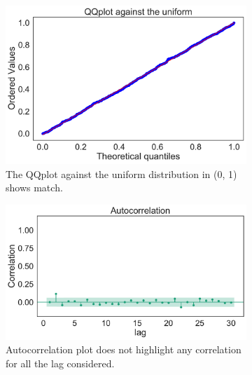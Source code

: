 \documentclass[twoside,onecolumn]{article}
\theoremstyle{definition}
\begin{document}
\begin{figure} \centering
\begin{subfigure}{0.45\textwidth}
         \includegraphics[width=\textwidth]{../results/QQplot.pdf}
         \caption{The QQplot against the uniform distribution in (0, 1) shows match. }\label{fig:lcgqq}
     \end{subfigure} \quad
     \begin{subfigure}{0.5\textwidth}
         \includegraphics[width=\textwidth]{../results/autocorrelation.pdf}
         \caption{Autocorrelation plot does not highlight any correlation for all the lag considered. }\label{fig:lcgauto}
     \end{subfigure}
  \begin{subfigure}{0.9\textwidth}

\end{subfigure}
\end{figure}
\end{document}
